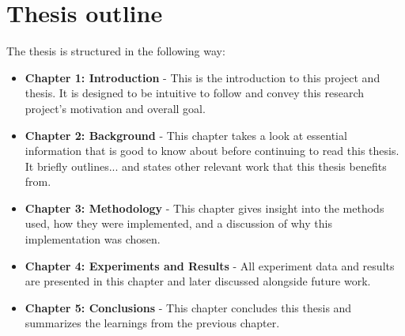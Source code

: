 \label{sec:1_7_thesis_outline}

\begin{comment}
Describe how you have divided your thesis into chapters, and briefly list what the reader will find in each chapter.
\end{comment}

\section{Thesis outline}

The thesis is structured in the following way:

\begin{itemize}
    \item \textbf{Chapter 1: Introduction} - This is the introduction to this project and thesis. It is designed to be intuitive to follow and convey this research project's motivation and overall goal.
    \item \textbf{Chapter 2: Background} - This chapter takes a look at essential information that is good to know about before continuing to read this thesis. It briefly outlines... and states other relevant work that this thesis benefits from. 
    \item \textbf{Chapter 3: Methodology} - This chapter gives insight into the methods used, how they were implemented, and a discussion of why this implementation was chosen. 
    \item \textbf{Chapter 4: Experiments and Results} - All experiment data and results are presented in this chapter and later discussed alongside future work. 
    \item \textbf{Chapter 5: Conclusions} - This chapter concludes this thesis and summarizes the learnings from the previous chapter. 
\end{itemize}